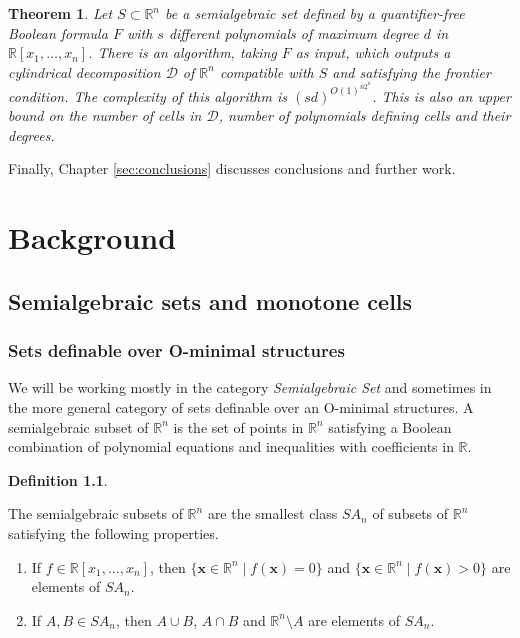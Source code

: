 \documentclass[
]{book}
\providecommand{\tightlist}{%
  \setlength{\itemsep}{0pt}\setlength{\parskip}{0pt}}
\newtheorem{theorem}{Theorem}[chapter]
\theoremstyle{definition}
\newtheorem{definition}{Definition}[chapter]
\theoremstyle{definition}
\theoremstyle{definition}
\theoremstyle{definition}
\theoremstyle{remark}
\begin{document}
\begin{theorem}
\protect\hypertarget{thm:main}{}\label{thm:main}Let \(S \subset \mathbb{R}^n\) be a semialgebraic set defined by a quantifier-free Boolean formula \(F\) with \(s\) different polynomials of maximum degree \(d\) in \(\mathbb{R}[x_1,\ldots,x_n]\).
There is an algorithm, taking \(F\) as input, which outputs a cylindrical decomposition \(\mathcal D\) of \(\mathbb{R}^n\) compatible with \(S\) and
satisfying the frontier condition.
The complexity of this algorithm is \((sd)^{O(1)^{n2^n}}\).
This is also an upper bound on the number of cells in \(\mathcal D\), number of polynomials defining cells and their degrees.
\end{theorem}

Finally, Chapter \ref{sec:conclusions} discusses conclusions and further work.

\hypertarget{sec:background}{%
\chapter{Background}\label{sec:background}}

\hypertarget{semialgebraic-sets-and-monotone-cells}{%
\section{Semialgebraic sets and monotone cells}\label{semialgebraic-sets-and-monotone-cells}}

\hypertarget{sets-definable-over-o-minimal-structures}{%
\subsection{Sets definable over O-minimal structures}\label{sets-definable-over-o-minimal-structures}}

We will be working mostly in the category \emph{Semialgebraic Set} and sometimes in the more general category of sets definable over an O-minimal structures.
A semialgebraic subset of \(\mathbb{R}^n\) is the set of points in \(\mathbb{R}^n\) satisfying a Boolean combination of polynomial equations and inequalities with coefficients in \(\mathbb{R}\).

\begin{definition}
\protect\hypertarget{def:semialgebraic-set}{}\label{def:semialgebraic-set}

The semialgebraic subsets of \(\mathbb{R}^n\) are the smallest class \({SA}_n\) of subsets of \(\mathbb{R}^n\) satisfying the following properties.

\begin{enumerate}
\def\labelenumi{\arabic{enumi}.}
\tightlist
\item
  If \(f \in \mathbb{R}[x_1,\ldots,x_n]\), then \(\{ \mathbf{x} \in \mathbb{R}^n \mid f(\mathbf{x}) = 0 \}\) and \(\{ \mathbf{x} \in \mathbb{R}^n \mid f(\mathbf{x}) > 0 \}\) are elements of \({SA}_n\).
\item
  If \(A, B \in {SA}_n\), then \(A \cup B\), \(A \cap B\) and \(\mathbb{R}^n \setminus A\) are elements of \({SA}_n\).
\end{enumerate}

\end{definition}
\end{document}
